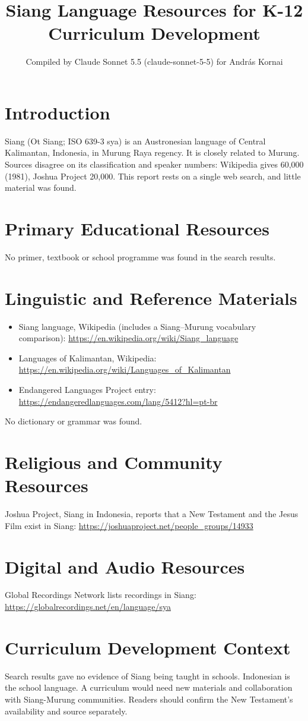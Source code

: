 \documentclass[12pt]{article}
\title{Siang Language Resources for K-12 Curriculum Development}
\author{Compiled by Claude Sonnet 5.5 (claude-sonnet-5-5) for Andr\'as Kornai}
\date{}
\begin{document}
\maketitle

\section{Introduction}
Siang (Ot Siang; ISO 639-3 sya) is an Austronesian language of Central Kalimantan, Indonesia, in Murung Raya regency. It is closely related to Murung. Sources disagree on its classification and speaker numbers: Wikipedia gives 60,000 (1981), Joshua Project 20,000. This report rests on a single web search, and little material was found.

\section{Primary Educational Resources}
No primer, textbook or school programme was found in the search results.

\section{Linguistic and Reference Materials}
\begin{itemize}
\item Siang language, Wikipedia (includes a Siang--Murung vocabulary comparison): \url{https://en.wikipedia.org/wiki/Siang_language}
\item Languages of Kalimantan, Wikipedia: \url{https://en.wikipedia.org/wiki/Languages_of_Kalimantan}
\item Endangered Languages Project entry: \url{https://endangeredlanguages.com/lang/5412?hl=pt-br}
\end{itemize}
No dictionary or grammar was found.

\section{Religious and Community Resources}
Joshua Project, Siang in Indonesia, reports that a New Testament and the Jesus Film exist in Siang: \url{https://joshuaproject.net/people_groups/14933}

\section{Digital and Audio Resources}
Global Recordings Network lists recordings in Siang: \url{https://globalrecordings.net/en/language/sya}

\section{Curriculum Development Context}
Search results gave no evidence of Siang being taught in schools. Indonesian is the school language. A curriculum would need new materials and collaboration with Siang-Murung communities. Readers should confirm the New Testament's availability and source separately.
\end{document}

